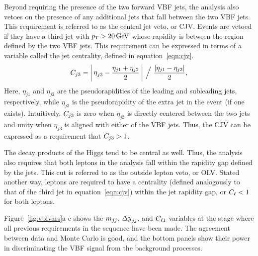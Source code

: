 Beyond requiring the presence of the two forward VBF jets, the analysis also vetoes on the presence of any additional jets that fall between the two VBF jets. This requirement is referred to as the central jet veto, or CJV. Events are vetoed if they have a third jet with $\pT > 20 \GeV$ whose rapidity is between the region defined by the two VBF jets. This requirement can be expressed in terms of a variable called the jet centrality, defined in equation~\ref{eqn:cjv}.
%
\begin{equation}
\cjv = \bigg|\, \etathirdjet - \frac{\eta_{j1} + \eta_{j2}}{2} \,\bigg|\ \Big/\ \frac{\left|\eta_{j1} - \eta_{j2}\right|}{2},
\label{eqn:cjv}
\end{equation}
%
Here, $\eta_{j1}$ and $\eta_{j2}$ are the pseudorapidities of the leading and subleading jets, respectively, while $\eta_{j3}$ is the pseudorapidity of the extra jet in the event (if one exists). Intuitively, $C_{j3}$ is zero when $\eta_{j3}$ is directly centered between the two jets and unity when $\eta_{j3}$ is aligned with either of the VBF jets. Thus, the CJV can be expressed as a requirement that $C_{j3} > 1$. 

The decay products of the Higgs tend to be central as well. Thus, the analysis also requires that both leptons in the analysis fall within the rapidity gap defined by the jets. This cut is referred to as the outside lepton veto, or OLV. Stated another way, leptons are required to have a centrality (defined analogously to that of the third jet in equation~\ref{eqn:cjv}) within the jet rapidity gap, or $C_{\ell} < 1$ for both leptons. 

Figure~\ref{fig:vbfvars}a-c shows the $m_{jj}$, $\dyjj$, and $C_{\ell1}$ variables at the stage where all previous requirements in the sequence have been made. The agreement between data and Monte Carlo is good, and the bottom panels show their power in discriminating the VBF signal from the background processes. 

